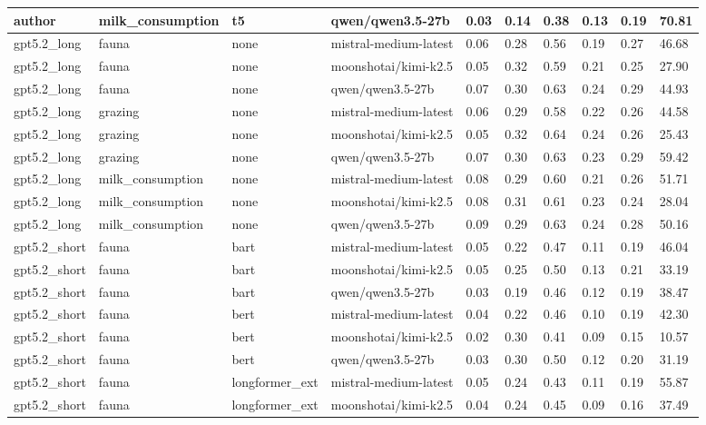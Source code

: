 \begin{tabular}{|l|l|l|l|l|l|l|l|l|l|}
 \hline
 author & milk\_consumption & t5 & qwen/qwen3.5-27b & 0.03 & 0.14 & 0.38 & 0.13 & 0.19 & 70.81 \\
 \hline
 gpt5.2\_long & fauna & none & mistral-medium-latest & 0.06 & 0.28 & 0.56 & 0.19 & 0.27 & 46.68 \\
 \hline
 gpt5.2\_long & fauna & none & moonshotai/kimi-k2.5 & 0.05 & 0.32 & 0.59 & 0.21 & 0.25 & 27.90 \\
 \hline
 gpt5.2\_long & fauna & none & qwen/qwen3.5-27b & 0.07 & 0.30 & 0.63 & 0.24 & 0.29 & 44.93 \\
 \hline
 gpt5.2\_long & grazing & none & mistral-medium-latest & 0.06 & 0.29 & 0.58 & 0.22 & 0.26 & 44.58 \\
 \hline
 gpt5.2\_long & grazing & none & moonshotai/kimi-k2.5 & 0.05 & 0.32 & 0.64 & 0.24 & 0.26 & 25.43 \\
 \hline
 gpt5.2\_long & grazing & none & qwen/qwen3.5-27b & 0.07 & 0.30 & 0.63 & 0.23 & 0.29 & 59.42 \\
 \hline
 gpt5.2\_long & milk\_consumption & none & mistral-medium-latest & 0.08 & 0.29 & 0.60 & 0.21 & 0.26 & 51.71 \\
 \hline
 gpt5.2\_long & milk\_consumption & none & moonshotai/kimi-k2.5 & 0.08 & 0.31 & 0.61 & 0.23 & 0.24 & 28.04 \\
 \hline
 gpt5.2\_long & milk\_consumption & none & qwen/qwen3.5-27b & 0.09 & 0.29 & 0.63 & 0.24 & 0.28 & 50.16 \\
 \hline
 gpt5.2\_short & fauna & bart & mistral-medium-latest & 0.05 & 0.22 & 0.47 & 0.11 & 0.19 & 46.04 \\
 \hline
 gpt5.2\_short & fauna & bart & moonshotai/kimi-k2.5 & 0.05 & 0.25 & 0.50 & 0.13 & 0.21 & 33.19 \\
 \hline
 gpt5.2\_short & fauna & bart & qwen/qwen3.5-27b & 0.03 & 0.19 & 0.46 & 0.12 & 0.19 & 38.47 \\
 \hline
 gpt5.2\_short & fauna & bert & mistral-medium-latest & 0.04 & 0.22 & 0.46 & 0.10 & 0.19 & 42.30 \\
 \hline
 gpt5.2\_short & fauna & bert & moonshotai/kimi-k2.5 & 0.02 & 0.30 & 0.41 & 0.09 & 0.15 & 10.57 \\
 \hline
 gpt5.2\_short & fauna & bert & qwen/qwen3.5-27b & 0.03 & 0.30 & 0.50 & 0.12 & 0.20 & 31.19 \\
 \hline
 gpt5.2\_short & fauna & longformer\_ext & mistral-medium-latest & 0.05 & 0.24 & 0.43 & 0.11 & 0.19 & 55.87 \\
 \hline
 gpt5.2\_short & fauna & longformer\_ext & moonshotai/kimi-k2.5 & 0.04 & 0.24 & 0.45 & 0.09 & 0.16 & 37.49 \\

\end{tabular}
